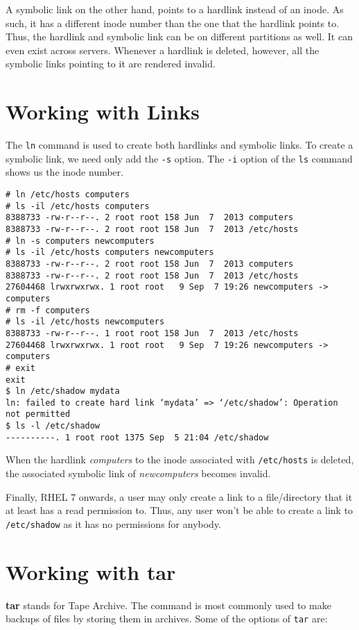 \noindent
A symbolic link on the other hand, points to a hardlink instead of an inode. As such, it has a different inode number than the one that the hardlink points to. Thus, the hardlink and symbolic link can be on different partitions as well. It can even exist across servers. Whenever a hardlink is deleted, however, all the symbolic links pointing to it are rendered invalid.

\section{Working with Links}
The \verb|ln| command is used to create both hardlinks and symbolic links. To create a symbolic link, we need only add the \verb|-s| option. The \verb|-i| option of the \verb|ls| command shows us the inode number.

\begin{verbatim}
# ln /etc/hosts computers
# ls -il /etc/hosts computers
8388733 -rw-r--r--. 2 root root 158 Jun  7  2013 computers
8388733 -rw-r--r--. 2 root root 158 Jun  7  2013 /etc/hosts
# ln -s computers newcomputers
# ls -il /etc/hosts computers newcomputers
8388733 -rw-r--r--. 2 root root 158 Jun  7  2013 computers
8388733 -rw-r--r--. 2 root root 158 Jun  7  2013 /etc/hosts
27604468 lrwxrwxrwx. 1 root root   9 Sep  7 19:26 newcomputers -> computers
# rm -f computers
# ls -il /etc/hosts newcomputers
8388733 -rw-r--r--. 1 root root 158 Jun  7  2013 /etc/hosts
27604468 lrwxrwxrwx. 1 root root   9 Sep  7 19:26 newcomputers -> computers
# exit
exit
$ ln /etc/shadow mydata
ln: failed to create hard link ‘mydata’ => ‘/etc/shadow’: Operation not permitted
$ ls -l /etc/shadow
----------. 1 root root 1375 Sep  5 21:04 /etc/shadow
\end{verbatim}
When the hardlink \textit{computers} to the inode associated with \texttt{/etc/hosts} is deleted, the associated symbolic link of \textit{newcomputers} becomes invalid.

\noindent
Finally, RHEL 7 onwards, a user may only create a link to a file/directory that it at least has a read permission to. Thus, any user won't be able to create a link to \texttt{/etc/shadow} as it has no permissions for anybody.

\section{Working with tar}
\textbf{tar} stands for Tape Archive. The command is most commonly used to make backups of files by storing them in archives. Some of the options of \verb|tar| are:

